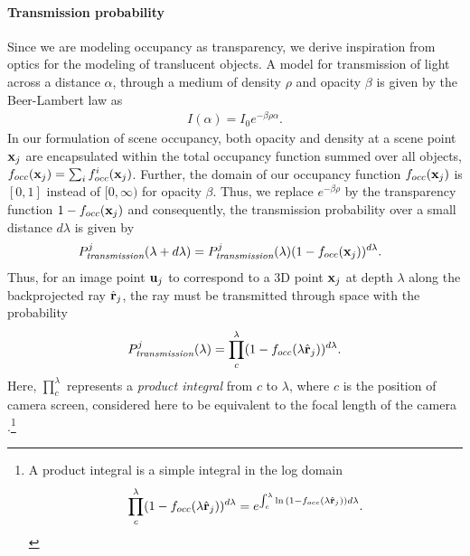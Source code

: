 \paragraph{Transmission probability}
\label{sec:ptransmission}
Since we are modeling occupancy as transparency, we derive inspiration from optics for the modeling of translucent objects. A model for transmission of light across a distance $\alpha$, through a medium of density $\rho$ and opacity $\beta$ is given by the Beer-Lambert law as
\begin{align}
I(\alpha) = I_0 e^{-\beta\rho\alpha}.
\end{align}
%
In our formulation of scene occupancy, both opacity and density at a scene point $\mathbf{x}_j$ are encapsulated within the total occupancy function summed over all objects, $f_{occ}(\mathbf{x}_j) = \sum_i f^i_{occ}(\mathbf{x}_j)$. Further, the domain of our occupancy function $f_{occ}(\mathbf{x}_j)$ is $[0, 1]$ instead of $[0, \infty)$ for opacity $\beta$. Thus, we replace $e^{-\beta\rho}$ by the transparency function $1 - f_{occ}(\mathbf{x}_j)$ and consequently, the transmission probability over a small distance $d\lambda$ is given by
%
\begin{align}
  \!\!\!\! P^j_{\textit{transmission}}(\lambda + d\lambda) = P^j_{\textit{transmission}}(\lambda) (1-f_{occ}(\mathbf{x}_j))^{d\lambda}.
\end{align}
%
Thus, for an image point $\mathbf{u}_j$ to correspond to a 3D point $\mathbf{x}_j$ at depth $\lambda$ along the backprojected ray $\hat{\mathbf{r}}_j$, the ray must be transmitted through space with the probability
\begin{align}
P^j_{\textit{transmission}}(\lambda) = \prod_{c}^{\lambda} (1 - f_{occ}(\lambda \hat{\mathbf{r}}_j))^{d\lambda}.
\label{eq:ptrans-integral}
\end{align}
Here, $\prod_{c}^{\lambda}$ represents a \emph{product integral} from $c$ to $\lambda$, where $c$ is the position of camera screen, considered here to be equivalent to the focal length of the camera .\footnote{A product integral is a simple integral in the log domain 
\vspace{-0.2cm}
\begin{equation}
\prod_{c}^{\lambda} (1 - f_{occ}(\lambda \hat{\mathbf{r}}_j))^{d\lambda} = e^{\int_{c}^{\lambda} \ln{(1 - f_{occ}(\lambda \hat{\mathbf{r}}_j))}{d\lambda}}. \nonumber
\end{equation}
}

